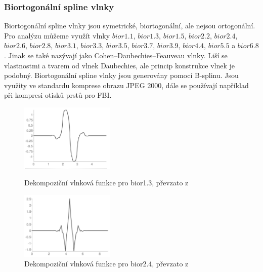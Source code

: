 \subsubsection{Biortogonální spline vlnky}
Biortogonální spline vlnky jsou symetrické, biortogonální, ale nejsou ortogonální. Pro analýzu můžeme využít vlnky $bior1.1$, $bior1.3$, $bior1.5$, $bior2.2$, $bior2.4$, $bior2.6$, $bior2.8$, $bior 3.1$, $bior3.3$, $bior3.5$, $bior3.7$, $bior3.9$, $bior4.4$, $bior5.5$ a $bior6.8$. \cite{PyWaveletsBrowser} Jinak se také nazývají jako Cohen–Daubechies–Feauveau vlnky. Liší se vlastnostmi a tvarem od vlnek Daubechies, ale princip konstrukce vlnek je podobný. Biortogonální spline vlnky jsou generovány pomocí B-splinu. \cite{GeneralizedBiorthogonalDaubechiesWavelets} Jsou využity ve standardu komprese obrazu JPEG 2000, dále se používají například při kompresi otisků prstů pro FBI. 

\begin{figure}[!htbp]
  \begin{minipage}[b]{0.5\linewidth}
    \centering
    \includegraphics[width=170px]{obrazky-figures/bior13wavelet.PNG}
    \caption{Dekompoziční vlnková funkce pro bior1.3, převzato z \cite{PyWaveletsBrowser}}
  \end{minipage}
  \hspace{0.5cm}
  \begin{minipage}[b]{0.5\linewidth}
    \centering
    \includegraphics[width=170px]{obrazky-figures/bior24wavelet.PNG}
    \caption{Dekompoziční vlnková funkce pro bior2.4, převzato z \cite{PyWaveletsBrowser}}
  \end{minipage}
\end{figure}

